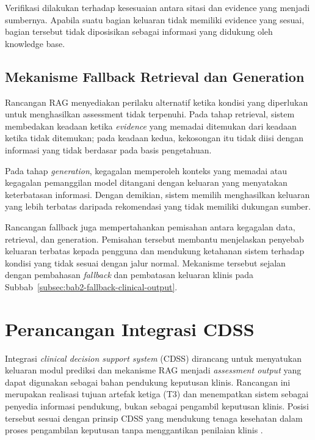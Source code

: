 Verifikasi dilakukan terhadap kesesuaian antara sitasi dan evidence yang menjadi sumbernya. Apabila suatu bagian keluaran tidak memiliki evidence yang sesuai, bagian tersebut tidak
diposisikan sebagai informasi yang didukung oleh knowledge base.

\subsection{Mekanisme Fallback Retrieval dan Generation} 
\label{subsec:bab4-fallback-retrieval-generation}

Rancangan RAG menyediakan perilaku alternatif ketika kondisi yang diperlukan untuk menghasilkan assessment tidak terpenuhi. Pada tahap retrieval, sistem membedakan keadaan ketika \textit{evidence} yang memadai ditemukan dari keadaan ketika tidak ditemukan; pada keadaan kedua, kekosongan itu
tidak diisi dengan informasi yang tidak berdasar pada basis pengetahuan.

Pada tahap \textit{generation}, kegagalan memperoleh konteks yang memadai atau kegagalan pemanggilan model ditangani dengan keluaran yang menyatakan keterbatasan
informasi. Dengan demikian, sistem memilih menghasilkan keluaran yang lebih terbatas daripada rekomendasi yang tidak memiliki dukungan sumber.

Rancangan fallback juga mempertahankan pemisahan antara kegagalan data, retrieval, dan generation. Pemisahan tersebut membantu menjelaskan penyebab keluaran terbatas kepada pengguna dan
mendukung ketahanan sistem terhadap kondisi yang tidak sesuai dengan jalur normal. Mekanisme tersebut sejalan dengan pembahasan \textit{fallback} dan pembatasan keluaran klinis pada Subbab~\ref{subsec:bab2-fallback-clinical-output}.

\section{Perancangan Integrasi CDSS} 
\label{sec:bab4-perancangan-integrasi-cdss}

Integrasi \textit{clinical decision support system} (CDSS) dirancang untuk menyatukan keluaran modul prediksi dan mekanisme RAG menjadi \textit{assessment output} yang dapat digunakan
sebagai bahan pendukung keputusan klinis. Rancangan ini merupakan realisasi tujuan artefak ketiga (T3) dan menempatkan sistem sebagai penyedia informasi pendukung, bukan sebagai
pengambil keputusan klinis. Posisi tersebut sesuai dengan prinsip CDSS yang mendukung tenaga kesehatan dalam proses pengambilan keputusan tanpa menggantikan penilaian klinis
\parencite{sutton2020}.

